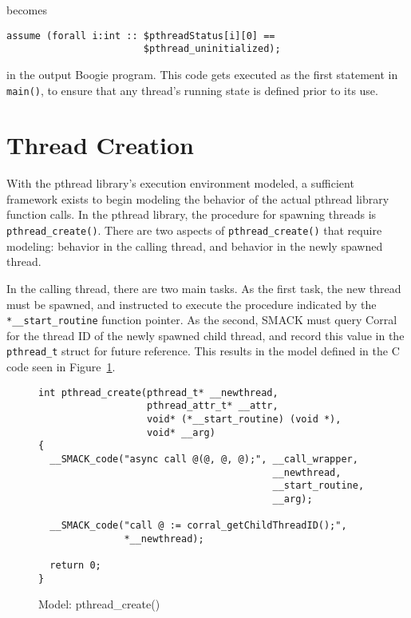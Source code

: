 \noindent becomes 

\begin{lstlisting}[frame=none,xleftmargin=2\parindent,language=boogie]
assume (forall i:int :: $pthreadStatus[i][0] == 
                        $pthread_uninitialized);
\end{lstlisting}

\noindent in the output Boogie program.  This code gets executed as
the first statement in \lstinline|main()|, to ensure that any thread's
running state is defined prior to its use. 

\section{Thread Creation}
With the pthread library's execution environment modeled, a sufficient
framework exists to begin modeling the behavior of the actual pthread
library function calls.  In the pthread library, the procedure for
spawning threads is \lstinline|pthread_create()|.  There are two
aspects of \lstinline|pthread_create()| that require modeling:
behavior in the calling thread, and behavior in the newly spawned
thread. 

In the calling thread, there are two main tasks.  As the first task,
the new thread must be spawned, and instructed to execute the
procedure indicated by the \lstinline|*__start_routine| function
pointer.  As the second, SMACK must query Corral for the thread ID of
the newly spawned child thread, and record this value in the
\lstinline|pthread_t| struct for future reference.  This results in
the model defined in the C code seen in Figure~\ref{fig:pthread_create}.

\begin{figure}[!ht]
\centering
\begin{lstlisting}
int pthread_create(pthread_t* __newthread,
                   pthread_attr_t* __attr,
                   void* (*__start_routine) (void *),
                   void* __arg)
{
  __SMACK_code("async call @(@, @, @);", __call_wrapper,
                                         __newthread,
                                         __start_routine,
                                         __arg);

  __SMACK_code("call @ := corral_getChildThreadID();",
               *__newthread);

  return 0;
}
\end{lstlisting}
\caption{Model: pthread\_create()}\label{fig:pthread_create}
\end{figure}


